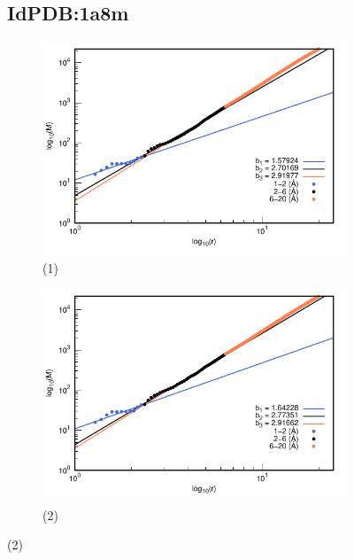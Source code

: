		\begin{figure}[H]
			\subsection*{IdPDB:1a8m}
			
			\hspace{-0.3cm} 
			\begin{subfigure}{0.49\textwidth}
				\centering
				\includegraphics[width=\linewidth,page=1]{graphs/PDBs/1a8m/1a8maddH.pdf}
				\caption{(1)}
			\end{subfigure}
			\hspace{0.2cm}
			\begin{subfigure}{0.49\textwidth}
				\centering
				\includegraphics[width=\linewidth,page=1]{graphs/PDBs/1a8m/1a8mEm.pdf}
				\caption{(2)}
			\end{subfigure}
			

\end{figure}
